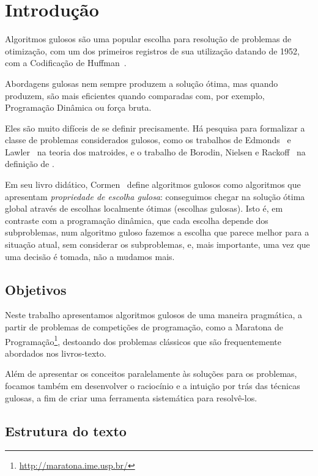\chapter{Introdução}
\label{intro}

Algoritmos gulosos são uma popular escolha para resolução de problemas de otimização, com um dos primeiros registros de sua utilização datando de 1952, com a Codificação de Huffman~\cite{huffman1952method}.

Abordagens gulosas nem sempre produzem a solução ótima, mas quando produzem, são mais eficientes quando comparadas com, por exemplo, Programação Dinâmica ou força bruta.

Eles são muito difíceis de se definir precisamente. Há pesquisa para formalizar a classe de problemas considerados gulosos, como os trabalhos de Edmonds~\cite{Edmonds1971} e Lawler~\cite{lawler2001combinatorial} na teoria dos matroides, e o trabalho de Borodin, Nielsen e Rackoff~\cite{Borodin2003} na definição de .

Em seu livro didático, Cormen~\cite{CLRS} define algoritmos gulosos como algoritmos que apresentam \emph{propriedade de escolha gulosa}: conseguimos chegar na solução ótima global através de escolhas localmente ótimas (escolhas gulosas). Isto é, em contraste com a programação dinâmica, que cada escolha depende dos subproblemas, num algoritmo guloso fazemos a escolha que parece melhor para a situação atual, sem considerar os subproblemas, e, mais importante, uma vez que uma decisão é tomada, não a mudamos mais.

\section{Objetivos}

Neste trabalho apresentamos algoritmos gulosos de uma maneira pragmática, a partir de problemas de competições de programação, como a Maratona de Programação\footnote{\url{http://maratona.ime.usp.br/}}, destoando dos problemas clássicos que são frequentemente abordados nos livros-texto.

Além de apresentar os conceitos paralelamente às soluções para os problemas, focamos também em desenvolver o raciocínio e a intuição por trás das técnicas gulosas, a fim de criar uma ferramenta sistemática para resolvê-los.

\section{Estrutura do texto}

